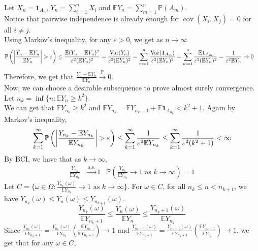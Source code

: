 \documentclass{huhtakm-template-book}
\newcommand{\prob}{\mathbb{P}}
\newcommand{\expect}{\mathbb{E}}
\DeclareMathOperator{\Var}{Var}
\DeclareMathOperator{\cov}{cov}
\begin{document}
\begin{proofing}
	Let $X_{n}=\mathbf{1}_{A_{n}}$, $Y_{n}=\sum_{i=1}^{n}X_{i}$ and $\expect Y_{n}=\sum_{m=1}^{n}\prob(A_{m})$.\\
	Notice that pairwise independence is already enough for $\cov(X_{i},X_{j})=0$ for all $i\neq j$.\\
	Using Markov's inequality, for any $\varepsilon>0$, we get as $n\to\infty$
	\begin{align*}
		\prob\left(\abs{\frac{Y_{n}-\expect Y_{n}}{\expect Y_{n}}}>\varepsilon\right)&\leq\frac{\expect(Y_{n}-\expect Y_{n})^{2}}{\varepsilon^{2}(\expect Y_{n})^{2}}=\frac{\Var(Y_{n})}{\varepsilon^{2}(\expect Y_{n})^{2}}=\sum_{m=1}^{n}\frac{\Var(\mathbf{1}_{A_{m}})}{\varepsilon^{2}(\expect Y_{n})^{2}}=\sum_{m=1}^{n}\frac{\expect\mathbf{1}_{A_{m}}}{\varepsilon^{2}(\expect Y_{n})^{2}}=\frac{1}{\varepsilon^{2}\expect Y_{n}}\to 0
	\end{align*}
	Therefore, we get that $\frac{Y_{n}-\expect Y_{n}}{\expect Y_{n}}\xrightarrow{\prob}0$.\\
	Now, we can choose a desirable subsequence to prove almost surely convergence. Let $n_{k}=\inf\{n:\expect Y_{n}\geq k^{2}\}$.\\
	We can get that $\expect Y_{n_{k}}\geq k^{2}$ and $\expect Y_{n_{k}}=\expect Y_{n_{k}-1}+\expect\mathbf{1}_{A_{n_{k}}}<k^{2}+1$. Again by Markov's inequality,
	\begin{equation*}
		\sum_{k=1}^{\infty}\prob\left(\abs{\frac{Y_{n_{k}}-\expect Y_{n_{k}}}{\expect Y_{n_{k}}}}>\varepsilon\right)\leq\sum_{k=1}^{\infty}\frac{1}{\varepsilon^{2}\expect Y_{n_{k}}}\leq\sum_{k=1}^{\infty}\frac{1}{\varepsilon^{2}(k^{2}+1)}<\infty
	\end{equation*}
	By BCI, we have that as $k\to\infty$,
	\begin{align*}
		\frac{Y_{n_{k}}}{\expect Y_{n_{k}}}&\xrightarrow{\text{a.s.}}1 & \prob\left(\frac{Y_{n_{k}}}{\expect Y_{n_{k}}}\to 1\text{ as }k\to\infty\right)=1
	\end{align*}
	Let $C=\{\omega\in\Omega:\frac{Y_{n_{k}}(\omega)}{\expect Y_{n_{k}}}\to 1\text{ as }k\to\infty\}$. For $\omega\in C$, for all $n_{k}\leq n<n_{k+1}$, we have $Y_{n_{k}}(\omega)\leq Y_{n}(\omega)\leq Y_{n_{k+1}}(\omega)$.
	\begin{equation*}
		\frac{Y_{n_{k}}(\omega)}{\expect Y_{n_{k}+1}}\leq\frac{Y_{n}(\omega)}{\expect Y_{n}}\leq\frac{Y_{n_{k}+1}(\omega)}{\expect Y_{n_{k}}}
	\end{equation*}
	Since $\frac{Y_{n_{k}}(\omega)}{\expect Y_{n_{k}+1}}=\frac{Y_{n_{k}}(\omega)}{\expect Y_{n_{k}}}\left(\frac{\expect Y_{n_{k}}}{\expect Y_{n_{k}+1}}\right)\to 1$ and $\frac{Y_{n_{k}+1}(\omega)}{\expect Y_{n_{k}+1}}=\frac{Y_{n_{k}+1}(\omega)}{\expect Y_{n_{k}+1}}\left(\frac{\expect Y_{n_{k}+1}}{\expect Y_{n_{k}}}\right)\to 1$, we get that for any $\omega\in C$,

\end{proofing}
\end{document}
